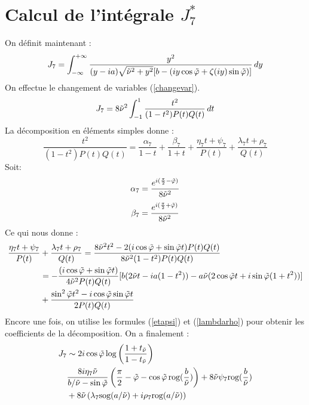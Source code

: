 \section{Calcul de l'intégrale $J_7^*$ }
On définit maintenant :
\begin{equation}
J_7=\int_{-\infty}^{+\infty}\frac{y^2}{(y-ia)\sqrt{\tilde{\nu}^2+y^2}\lbrack b-( iy\cos \tilde{\varphi}+ \zeta(iy)\sin \tilde{\varphi}) \rbrack}\,dy
\label{defJ7}
\end{equation}
On effectue le changement de variables (\ref{changevar}).
$$ J_7=8\tilde{\nu}^2 \int_{-1}^{1} \frac{t^2}{(1-t^2)P(t)Q(t)}\,dt$$
La décomposition en éléments simples donne :
$$\frac{t^2}{(1-t^2)P(t)Q(t)}=\frac{\alpha_7}{1-t}+\frac{\beta_7}{1+t}+\frac{\eta_7 t+\psi_7}{P(t)}+\frac{\lambda_7 t +\rho_7}{Q(t)}$$
Soit:
$$\alpha_7=\frac{e^{i(\frac{\pi}{2}-\tilde{\varphi})}}{8\tilde{\nu}^2}$$
$$\beta_7=\frac{e^{i(\frac{\pi}{2}+\tilde{\varphi})}}{8\tilde{\nu}^2}$$
Ce qui nous donne :
\begin{equation*}
\begin{split}
\frac{\eta_7 t+\psi_7}{P(t)}&+\frac{\lambda_7 t +\rho_7}{Q(t)}=\frac{8\tilde{\nu}^2t^2-2(i\cos\tilde{\varphi}+\sin\tilde{\varphi} t)P(t)Q(t)}{8\tilde{\nu}^2(1-t^2)P(t)Q(t)}\\
&=-\frac{(i\cos\tilde{\varphi}+\sin\tilde{\varphi} t)}{4\tilde{\nu}^2P(t)Q(t)}\lbrack b(2\tilde{\nu} t-ia(1-t^2))-a\tilde{\nu}(2\cos\tilde{\varphi} t+i\sin\tilde{\varphi}(1+t^2)) \rbrack\\
&+\frac{\sin^2\tilde{\varphi} t^2-i\cos\tilde{\varphi}\sin\tilde{\varphi} t}{2P(t)Q(t)}
\end{split}
\end{equation*}
Encore une fois, on utilise les formules (\ref{etapsi}) et (\ref{lambdarho}) pour obtenir les coefficients de la décomposition. On a finalement :
\begin{equation}
\begin{split}
J_7&\sim 2i\cos\tilde{\varphi}\log\left(\frac{1+t_{\tilde{\nu}}}{1-t_{\tilde{\nu}}}\right) \\
&\frac{8i\eta_7\tilde{\nu} }{b/\tilde{\nu}-\sin\tilde{\varphi}}\left(\frac{\pi}{2}-\tilde{\varphi}-\cos\tilde{\varphi} \,\mbox{rog}(\frac{b}{\tilde{\nu}}) \right)+8\tilde{\nu} \psi_7 \mbox{rog}(\frac{b}{\tilde{\nu}} )\\
&+8\tilde{\nu} \left(\lambda_7 \mbox{sog}(a/\tilde{\nu})+i\rho_7 \mbox{rog}(a/\tilde{\nu}) \right)
\end{split}
\label{valJ7}
\end{equation}


